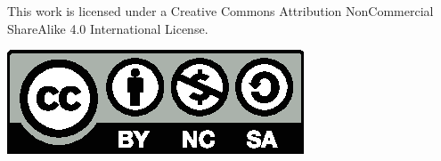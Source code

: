 \begin{center}
\begin{minipage}{0.8\textwidth}
\begin{center}
This work is licensed under a Creative Commons Attribution NonCommercial ShareAlike 4.0 International License.

\vspace{12pt}

\includegraphics[scale=0.8]{src/ring/gfx/by-nc-sa.eps}
\end{center}
\end{minipage}
\end{center}
